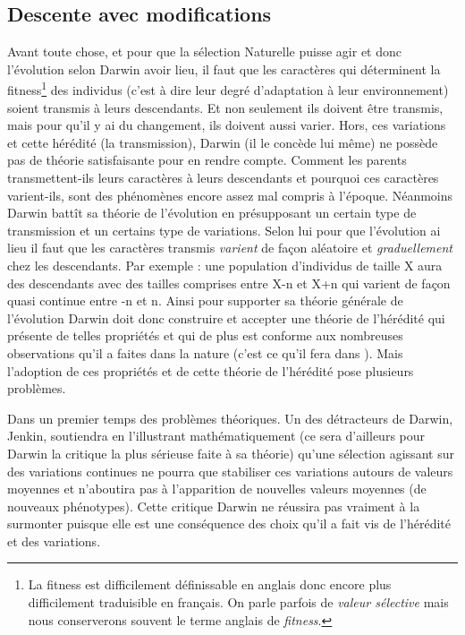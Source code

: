 \subsection{Descente avec modifications}\label{sec:hered}
Avant toute chose, et pour que la sélection Naturelle puisse agir et donc l'évolution selon Darwin avoir lieu, il faut que les caractères qui déterminent la fitness\footnote{La fitness est difficilement définissable en anglais donc encore plus difficilement traduisible en français. On parle parfois de \emph{valeur sélective} mais nous conserverons souvent le terme anglais de \emph{fitness}.} des individus (c'est à dire leur degré d'adaptation à leur environnement) soient transmis à leurs descendants. Et non seulement ils doivent être transmis, mais pour qu'il y ai du changement, ils doivent aussi varier. Hors, ces variations et cette hérédité (la transmission), Darwin (il le concède lui même) ne possède pas de théorie satisfaisante pour en rendre compte. Comment les parents transmettent-ils leurs caractères à leurs descendants et pourquoi ces caractères varient-ils, sont des phénomènes encore assez mal compris à l'époque. Néanmoins Darwin battît sa théorie de l'évolution en présupposant un certain type de transmission et un certains type de variations. Selon lui pour que l'évolution ai lieu il faut que les caractères transmis \emph{varient} de façon aléatoire et \emph{graduellement} chez les descendants. Par exemple : une population d'individus de taille X aura des descendants avec des tailles comprises entre X-n et X+n qui varient de façon quasi continue entre -n et n. Ainsi pour supporter sa théorie générale de l'évolution Darwin doit donc construire et accepter une théorie de l'hérédité qui présente de telles propriétés et qui de plus est conforme aux nombreuses observations qu'il a faites dans la nature (c'est ce qu'il fera dans \cite{darwin1868variation}). Mais l'adoption de ces propriétés et de cette théorie de l'hérédité pose plusieurs problèmes.

Dans un premier temps des problèmes théoriques. Un des détracteurs de Darwin, Jenkin, soutiendra en l'illustrant mathématiquement (ce sera d'ailleurs pour Darwin la critique la plus sérieuse faite à sa théorie) qu'une sélection agissant sur des variations continues ne pourra que stabiliser ces variations autours de valeurs moyennes et n'aboutira pas à l'apparition de nouvelles valeurs moyennes (de nouveaux phénotypes). Cette critique Darwin ne réussira pas vraiment à la surmonter puisque elle est une conséquence des choix qu'il a fait vis de l'hérédité et des variations. 

